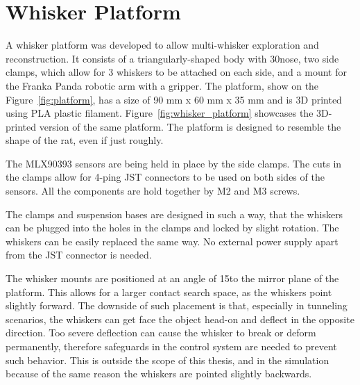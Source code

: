 \section{Whisker Platform}

A whisker platform was developed to allow multi-whisker exploration and reconstruction.
It consists of a triangularly-shaped body with 30\degree nose, two side clamps, which allow for 3 whiskers to be attached on each side, and a mount for the Franka Panda robotic arm with a gripper.
The platform, show on the Figure~\cref{fig:platform}, has a size of 90 mm x 60 mm x 35 mm and is 3D printed using PLA plastic filament.
Figure~\ref{fig:whisker_platform} showcases the 3D-printed version of the same platform.
The platform is designed to resemble the shape of the rat, even if just roughly.

The MLX90393 sensors are being held in place by the side clamps.
The cuts in the clamps allow for 4-ping JST connectors to be used on both sides of the sensors.
All the components are hold together by M2 and M3 screws.

The clamps and suspension bases are designed in such a way, that the whiskers can be plugged into the holes in the clamps and locked by slight rotation.
The whiskers can be easily replaced the same way.
No external power supply apart from the JST connector is needed.

The whisker mounts are positioned at an angle of 15\degree to the mirror plane of the platform.
This allows for a larger contact search space, as the whiskers point slightly forward.
The downside of such placement is that, especially in tunneling scenarios, the whiskers can get face the object head-on and deflect in the opposite direction.
Too severe deflection can cause the whisker to break or deform permanently, therefore safeguards in the control system are needed to prevent such behavior.
This is outside the scope of this thesis, and in the simulation because of the same reason the whiskers are pointed slightly backwards.

